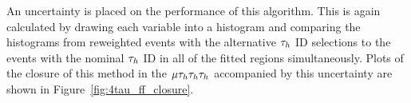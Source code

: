 An uncertainty is placed on the performance of this algorithm.
This is again calculated by drawing each variable into a histogram and comparing the histograms from reweighted events with the alternative $\tau_{h}$ ID selections to the events with the nominal $\tau_{h}$ ID in all of the fitted regions simultaneously.
Plots of the closure of this method in the $\mu\tau_{h}\tau_{h}\tau_{h}$ accompanied by this uncertainty are shown in Figure~\ref{fig:4tau_ff_closure}. \\

\begin{figure}[!hbtp]
\centering
     \\

\end{figure}
